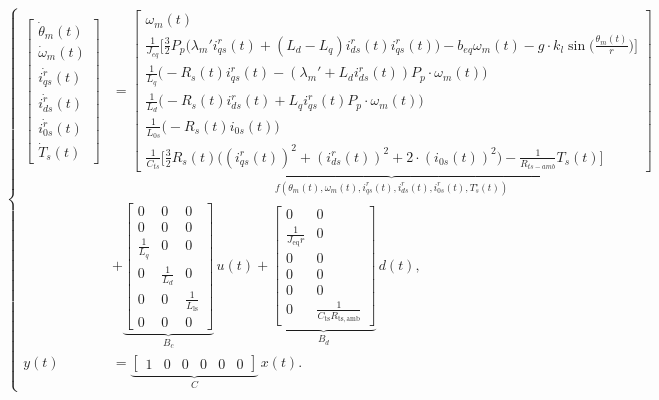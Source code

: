 \documentclass{article}
\begin{document}
\begin{equation}
\left\{
\begin{aligned}
\begin{bmatrix}
    \dot{\theta}_m(t) \\
    \dot{\omega}_m(t) \\
    \dot{i_{qs}^r}(t) \\
    \dot{i_{ds}^r}(t) \\
    \dot{i_{0s}^r}(t) \\
    \dot{T}_s(t)
\end{bmatrix}
&=
\underbrace{
\begin{bmatrix}
    \omega_m(t) \\
    \frac{1}{J_{eq}} \Bigg[ \frac{3}{2} P_p \Big( \lambda_m' i_{qs}^r(t) + (L_d - L_q) i_{ds}^r(t) i_{qs}^r(t) \Big) - b_{eq} \omega_m(t) - g \cdot k_l \sin\Bigg(\frac{\theta_m(t)}{r}\Bigg) \Bigg] \\
    \frac{1}{L_q} \Big(- R_s(t) i_{qs}^r(t) - (\lambda_m' + L_d i_{ds}^r(t)) P_p \cdot \omega_m(t) \Big) \\
    \frac{1}{L_d} \Big( - R_s(t) i_{ds}^r(t) + L_q i_{qs}^r(t) P_p \cdot \omega_m(t) \Big) \\
    \frac{1}{L_{0s}} \Big( - R_s(t) i_{0s}(t) \Big) \\
    \frac{1}{C_{ts}} \Bigg[ \frac{3}{2} R_s(t) \Big( (i_{qs}^r(t))^2 + (i_{ds}^r(t))^2 + 2 \cdot (i_{0s}(t))^2 \Big) - \frac{1}{R_{ts-amb}} T_s(t) \Bigg]
\end{bmatrix}
}_{f(\theta_m(t),\omega_m(t),i_{qs}^r(t),i_{ds}^r(t),i_{0s}^r(t),T^\circ_s(t))}
 \\ &+
\underbrace{
\begin{bmatrix}
0 & 0 & 0 \\
0 & 0 & 0 \\
\frac{1}{L_q} & 0 & 0 \\
0 & \frac{1}{L_d} & 0 \\
0 & 0 & \frac{1}{L_{\mathrm{ls}}} \\
0 & 0 & 0
\end{bmatrix} }_{B_c}
\, u(t)
+
\underbrace{\begin{bmatrix}
0 & 0 \\
\frac{1}{J_{\mathrm{eq}} r} & 0 \\
0 & 0 \\
0 & 0 \\
0 & 0 \\
0 & \frac{1}{C_{\mathrm{ts}} R_{\mathrm{ts},\mathrm{amb}}}
\end{bmatrix} }_{B_d}
\, d(t), \\
y(t) &=
\underbrace{\begin{bmatrix}
    1 & 0 & 0 & 0 & 0 & 0
\end{bmatrix}}_{C}
\, x(t).
\end{aligned}
\right.
\end{equation}
\end{document}
